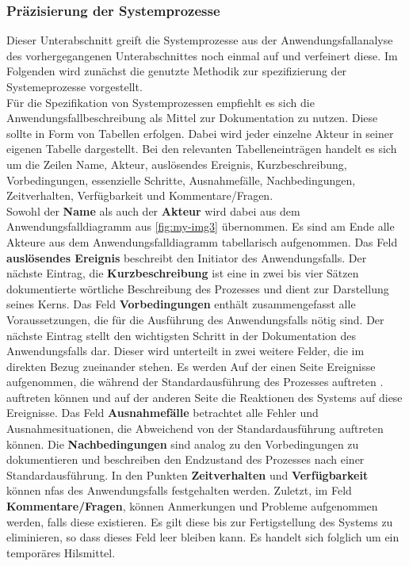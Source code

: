 \documentclass[../Bachelorarbeit.tex]{subfiles}
\begin{document}
\subsubsection{Präzisierung der Systemprozesse} \label{AnwfallSpezPraez}
Dieser Unterabschnitt greift die Systemprozesse aus der Anwendungsfallanalyse des vorhergegangenen Unterabschnittes noch einmal auf und verfeinert diese. Im Folgenden wird zunächst die genutzte Methodik zur spezifizierung der Systemeprozesse vorgestellt.\\
Für die Spezifikation von Systemprozessen empfiehlt es sich die Anwendungsfallbeschreibung als Mittel zur Dokumentation zu nutzen. Diese sollte in Form von Tabellen erfolgen. Dabei wird jeder einzelne Akteur in seiner eigenen Tabelle dargestellt. Bei den relevanten Tabelleneinträgen handelt es sich um die Zeilen Name, Akteur, auslösendes Ereignis, Kurzbeschreibung, Vorbedingungen, essenzielle Schritte, Ausnahmefälle, Nachbedingungen, Zeitverhalten, Verfügbarkeit und Kommentare/Fragen.\\ %
Sowohl der \textbf{Name} als auch der \textbf{Akteur} wird dabei aus dem Anwendungsfalldiagramm aus \autoref{fig:my-img3} übernommen. Es sind am Ende alle Akteure aus dem Anwendungsfalldiagramm tabellarisch aufgenommen. Das Feld \textbf{auslösendes Ereignis} beschreibt den Initiator des Anwendungsfalls. Der nächste Eintrag, die \textbf{Kurzbeschreibung} ist eine in zwei bis vier Sätzen dokumentierte wörtliche Beschreibung des Prozesses und dient zur Darstellung seines Kerns. Das Feld \textbf{Vorbedingungen} enthält zusammengefasst alle Voraussetzungen, die für die Ausführung des Anwendungsfalls nötig sind. Der nächste Eintrag stellt den wichtigsten Schritt in der Dokumentation des Anwendungsfalls dar. Dieser wird unterteilt in zwei weitere Felder, die im direkten Bezug zueinander stehen. Es werden Auf der einen Seite Ereignisse aufgenommen, die während der Standardausführung des Prozesses auftreten \bzw. auftreten können und auf der anderen Seite die Reaktionen des Systems auf diese Ereignisse. Das Feld \textbf{Ausnahmefälle} betrachtet alle Fehler und Ausnahmesituationen, die Abweichend von der Standardausführung auftreten können. Die \textbf{Nachbedingungen} sind analog zu den Vorbedingungen zu dokumentieren und beschreiben den Endzustand des Prozesses nach einer Standardausführung. In den Punkten \textbf{Zeitverhalten} und \textbf{Verfügbarkeit} können \acp{nfa} des Anwendungsfalls festgehalten werden. Zuletzt, im Feld \textbf{Kommentare/Fragen}, können Anmerkungen und Probleme aufgenommen werden, falls diese existieren. Es gilt diese bis zur Fertigstellung des Systems zu eliminieren, so dass dieses Feld leer bleiben kann. Es handelt sich folglich um ein temporäres Hilsmittel.\\
\end{document}

